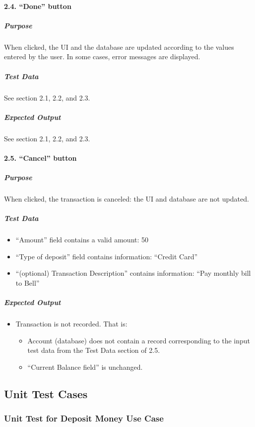 \documentclass[12pt]{article}
\begin{document}
\paragraph{2.4. ``Done'' button}

\subparagraph{Purpose} When clicked, the UI and the database are updated according to the values entered by the user. In some cases, error messages are displayed.
 
\subparagraph{Test Data}
See section 2.1, 2.2, and 2.3.
 
\subparagraph{Expected Output}
See section 2.1, 2.2, and 2.3.
 
\paragraph{2.5. ``Cancel'' button}
 
\subparagraph{Purpose} When clicked, the transaction is canceled: the UI and database are not updated.
 
\subparagraph{Test Data}
\begin{itemize}
  \item ``Amount'' field contains a valid amount: 50
  \item ``Type of deposit'' field contains information: ``Credit Card''
  \item ``(optional) Transaction Description'' contains information: ``Pay monthly bill to Bell''
 \end{itemize}

\subparagraph{Expected Output}
\begin{itemize}
  \item Transaction is not recorded. That is:
\begin{itemize}
  \item Account (database) does not contain a record corresponding to the input test data from the Test Data section of 2.5.
  \item ``Current Balance field'' is unchanged.
\end{itemize}
\end{itemize}

\subsection{Unit Test Cases}

\subsubsection{Unit Test for Deposit Money Use Case}
\end{document}
